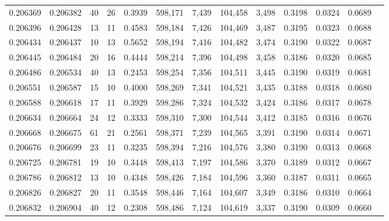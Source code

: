\begin{tabular}{rrrrrrrrrrrrr}
0.206369 & 0.206382 &    40 &  26 &                                     0.3939 & 598,171 &   7,439 & 104,458 &   3,498 & 0.3198 & 0.0324 & 0.0689 \\
0.206396 & 0.206428 &    13 &  11 &                                     0.4583 & 598,184 &   7,426 & 104,469 &   3,487 & 0.3195 & 0.0323 & 0.0688 \\
0.206434 & 0.206437 &    10 &  13 &                                     0.5652 & 598,194 &   7,416 & 104,482 &   3,474 & 0.3190 & 0.0322 & 0.0687 \\
0.206445 & 0.206484 &    20 &  16 &                                     0.4444 & 598,214 &   7,396 & 104,498 &   3,458 & 0.3186 & 0.0320 & 0.0685 \\
0.206486 & 0.206534 &    40 &  13 &                                     0.2453 & 598,254 &   7,356 & 104,511 &   3,445 & 0.3190 & 0.0319 & 0.0681 \\
0.206551 & 0.206587 &    15 &  10 &                                     0.4000 & 598,269 &   7,341 & 104,521 &   3,435 & 0.3188 & 0.0318 & 0.0680 \\
0.206588 & 0.206618 &    17 &  11 &                                     0.3929 & 598,286 &   7,324 & 104,532 &   3,424 & 0.3186 & 0.0317 & 0.0678 \\
0.206634 & 0.206664 &    24 &  12 &                                     0.3333 & 598,310 &   7,300 & 104,544 &   3,412 & 0.3185 & 0.0316 & 0.0676 \\
0.206668 & 0.206675 &    61 &  21 &                                     0.2561 & 598,371 &   7,239 & 104,565 &   3,391 & 0.3190 & 0.0314 & 0.0671 \\
0.206676 & 0.206699 &    23 &  11 &                                     0.3235 & 598,394 &   7,216 & 104,576 &   3,380 & 0.3190 & 0.0313 & 0.0668 \\
0.206725 & 0.206781 &    19 &  10 &                                     0.3448 & 598,413 &   7,197 & 104,586 &   3,370 & 0.3189 & 0.0312 & 0.0667 \\
0.206786 & 0.206812 &    13 &  10 &                                     0.4348 & 598,426 &   7,184 & 104,596 &   3,360 & 0.3187 & 0.0311 & 0.0665 \\
0.206826 & 0.206827 &    20 &  11 &                                     0.3548 & 598,446 &   7,164 & 104,607 &   3,349 & 0.3186 & 0.0310 & 0.0664 \\
0.206832 & 0.206904 &    40 &  12 &                                     0.2308 & 598,486 &   7,124 & 104,619 &   3,337 & 0.3190 & 0.0309 & 0.0660 \\

\end{tabular}
